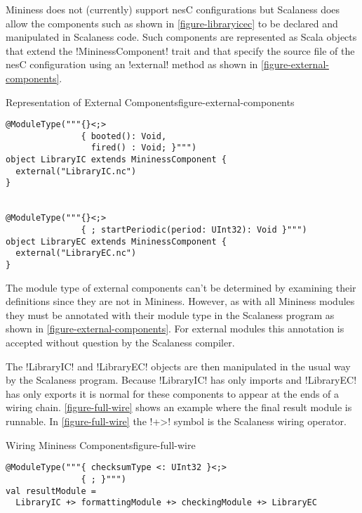 Mininess does not (currently) support nesC configurations but Scalaness does allow the
components such as shown in \autoref{figure-libraryicec} to be declared and manipulated in
Scalaness code. Such components are represented as Scala objects that extend the
!MininessComponent! trait and that specify the source file of the nesC configuration using an
!external! method as shown in \autoref{figure-external-components}.

\singlespace
\begin{fpfig}[tbhp]{Representation of External Components}{figure-external-components}
{
\begin{lstlisting}[language=scalaness]
@ModuleType("""{}<;>
               { booted(): Void,
                 fired() : Void; }""")
object LibraryIC extends MininessComponent {
  external("LibraryIC.nc")
}


@ModuleType("""{}<;>
               { ; startPeriodic(period: UInt32): Void }""")
object LibraryEC extends MininessComponent {
  external("LibraryEC.nc")
}
\end{lstlisting}
}
\end{fpfig}
\primaryspacing

The module type of external components can't be determined by examining their definitions since
they are not in Mininess. However, as with all Mininess modules they must be annotated with
their module type in the Scalaness program as shown in \autoref{figure-external-components}. For
external modules this annotation is accepted without question by the Scalaness compiler.

The !LibraryIC! and !LibraryEC! objects are then manipulated in the usual way by the Scalaness
program. Because !LibraryIC! has only imports and !LibraryEC! has only exports it is normal for
these components to appear at the ends of a wiring chain. \autoref{figure-full-wire} shows an
example where the final result module is runnable. In \autoref{figure-full-wire} the !+>!
symbol is the Scalaness wiring operator.

\singlespace
\begin{fpfig}[tbhp]{Wiring Mininess Components}{figure-full-wire}
{
\begin{lstlisting}[language=scalaness]
@ModuleType("""{ checksumType <: UInt32 }<;>
               { ; }""")
val resultModule =
  LibraryIC +> formattingModule +> checkingModule +> LibraryEC
\end{lstlisting}
}
\end{fpfig}
\primaryspacing

